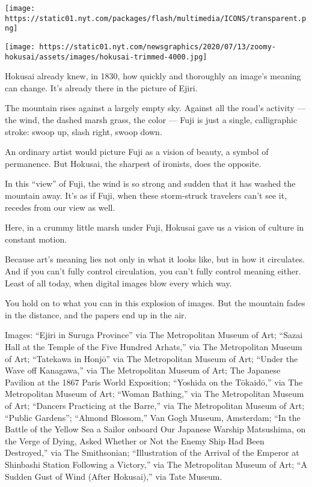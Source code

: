 \texttt{[image: https://static01.nyt.com/packages/flash/multimedia/ICONS/transparent.png]}

\texttt{[image: https://static01.nyt.com/newsgraphics/2020/07/13/zoomy-hokusai/assets/images/hokusai-trimmed-4000.jpg]}

Hokusai already knew, in 1830, how quickly and thoroughly an image's
meaning can change. It's already there in the picture of Ejiri.

The mountain rises against a largely empty sky. Against all the road's
activity --- the wind, the dashed marsh grass, the color --- Fuji is
just a single, calligraphic stroke: swoop up, slash right, swoop down.

An ordinary artist would picture Fuji as a vision of beauty, a symbol of
permanence. But Hokusai, the sharpest of ironists, does the opposite.

In this ``view'' of Fuji, the wind is so strong and sudden that it has
washed the mountain away. It's as if Fuji, when these storm-struck
travelers can't see it, recedes from our view as well.

Here, in a crummy little marsh under Fuji, Hokusai gave us a vision of
culture in constant motion.

Because art's meaning lies not only in what it looks like, but in how it
circulates. And if you can't fully control circulation, you can't fully
control meaning either. Least of all today, when digital images blow
every which way.

You hold on to what you can in this explosion of images. But the
mountain fades in the distance, and the papers end up in the air.

Images: ``Ejiri in Suruga Province'' via The Metropolitan Museum of Art;
``Sazai Hall at the Temple of the Five Hundred Arhats,'' via The
Metropolitan Museum of Art; ``Tatekawa in Honjō'' via The Metropolitan
Museum of Art; ``Under the Wave off Kanagawa,'' via The Metropolitan
Museum of Art; The Japanese Pavilion at the 1867 Paris World Exposition;
``Yoshida on the Tōkaidō,'' via The Metropolitan Museum of Art; ``Woman
Bathing,'' via The Metropolitan Museum of Art; ``Dancers Practicing at
the Barre,'' via The Metropolitan Museum of Art; ``Public Gardens'';
``Almond Blossom,'' Van Gogh Museum, Amsterdam; ``In the Battle of the
Yellow Sea a Sailor onboard Our Japanese Warship Matsushima, on the
Verge of Dying, Asked Whether or Not the Enemy Ship Had Been
Destroyed,'' via The Smithsonian; ``Illustration of the Arrival of the
Emperor at Shinbashi Station Following a Victory,'' via The Metropolitan
Museum of Art; ``A Sudden Gust of Wind (After Hokusai),'' via Tate
Museum.

